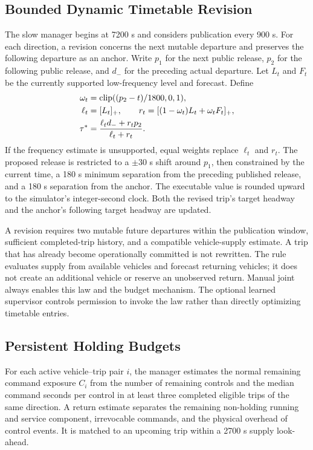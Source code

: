 \subsection{Bounded Dynamic Timetable Revision}
The slow manager begins at 7200 s and considers publication every 900 s. For each direction, a revision concerns the next mutable departure and preserves the following departure as an anchor. Write $p_1$ for the next public release, $p_2$ for the following public release, and $d_-$ for the preceding actual departure. Let $L_t$ and $F_t$ be the currently supported low-frequency level and forecast. Define
\begin{align}
 \omega_t&=\operatorname{clip}((p_2-t)/1800,0,1),\\
 \ell_t&=[L_t]_+,\qquad r_t=[(1-\omega_t)L_t+\omega_t F_t]_+,\\
 \tau^*&=\frac{\ell_t d_-+r_t p_2}{\ell_t+r_t}.
 \label{eq:timetable}
\end{align}
If the frequency estimate is unsupported, equal weights replace $\ell_t$ and $r_t$. The proposed release is restricted to a $\pm30$ s shift around $p_1$, then constrained by the current time, a 180 s minimum separation from the preceding published release, and a 180 s separation from the anchor. The executable value is rounded upward to the simulator's integer-second clock. Both the revised trip's target headway and the anchor's following target headway are updated.

A revision requires two mutable future departures within the publication window, sufficient completed-trip history, and a compatible vehicle-supply estimate. A trip that has already become operationally committed is not rewritten. The rule evaluates supply from available vehicles and forecast returning vehicles; it does not create an additional vehicle or reserve an unobserved return. Manual joint always enables this law and the budget mechanism. The optional learned supervisor controls permission to invoke the law rather than directly optimizing timetable entries.

\subsection{Persistent Holding Budgets}
For each active vehicle--trip pair $i$, the manager estimates the normal remaining command exposure $C_i$ from the number of remaining controls and the median command seconds per control in at least three completed eligible trips of the same direction. A return estimate separates the remaining non-holding running and service component, irrevocable commands, and the physical overhead of control events. It is matched to an upcoming trip within a 2700 s supply look-ahead.

